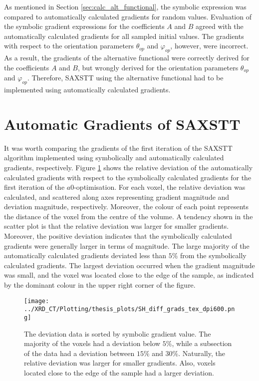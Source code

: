 
As mentioned in Section \ref{sec:calc_alt_functional}, the symbolic expression was compared to automatically calculated gradients for random values.
Evaluation of the symbolic gradient expressions for the coefficients $A$ and $B$ agreed with the automatically calculated gradients for all sampled initial values.
The gradients with respect to the orientation parameters $\theta_{op}$ and $\varphi_{op}$, however, were incorrect.
As a result, the gradients of the alternative functional were correctly derived for the coefficients $A$ and $B$,
but wrongly derived for the orientation parameters $\theta_{op}$ and $\varphi_{op}$.
Therefore, SAXSTT using the alternative functional had to be implemented using automatically calculated gradients.

\section{Automatic Gradients of SAXSTT}

It was worth comparing the gradients of the first iteration of the SAXSTT algorithm implemented using symbolically and automatically calculated gradients, respectively.
Figure \ref{fig:gradient_comparison} shows
the relative deviation of the automatically calculated gradients with respect to the symbolically calculated gradients for the first iteration of the $a0$-optimisation.
For each voxel, the relative deviation was calculated, and scattered along axes representing gradient magnitude and deviation magnitude, respectively.
Moreover, the colour of each point represents the distance of the voxel from the centre of the volume.
A tendency shown in the scatter plot is that the relative deviation was larger for smaller gradients.
Moreover, the positive deviation indicates that the symbolically calculated gradients were generally larger in terms of magnitude.
The large majority of the automatically calculated gradients deviated less than $5\%$ from the symbolically calculated gradients.
The largest deviation occurred when the gradient magnitude was small, and the voxel was located close to the edge of the sample,
as indicated by the dominant colour in the upper right corner of the figure.

\begin{figure}[h!]
    \centering
    \texttt{[image: ../XRD\_CT/Plotting/thesis\_plots/SH\_diff\_grads\_tex\_dpi600.png]}
    \caption[Initial Gradient Deviation]{The deviation data is sorted by symbolic gradient value.
        The majority of the voxels had a deviation below $5\%$, while a subsection of the data had a deviation between $15\%$ and $30\%$.
        Naturally, the relative deviation was larger for smaller gradients.
        Also, voxels located close to the edge of the sample had a larger deviation.}
    \label{fig:gradient_comparison}
\end{figure} %



